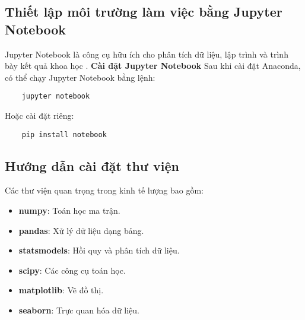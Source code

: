 \subsection{Thiết lập môi trường làm việc bằng Jupyter Notebook}
Jupyter Notebook là công cụ hữu ích cho phân tích dữ liệu, lập trình và trình bày kết quả khoa học \cite{kluyver2016jupyter}.
\textbf{Cài đặt Jupyter Notebook}
Sau khi cài đặt Anaconda, có thể chạy Jupyter Notebook bằng lệnh:
\begin{verbatim}
    jupyter notebook
\end{verbatim}
Hoặc cài đặt riêng:
\begin{verbatim}
    pip install notebook
\end{verbatim}

\subsection{Hướng dẫn cài đặt thư viện}
Các thư viện quan trọng trong kinh tế lượng bao gồm:
\begin{itemize}
    \item \textbf{numpy}: Toán học ma trận.
    \item \textbf{pandas}: Xử lý dữ liệu dạng bảng.
    \item \textbf{statsmodels}: Hồi quy và phân tích dữ liệu.
    \item \textbf{scipy}: Các công cụ toán học.
    \item \textbf{matplotlib}: Vẽ đồ thị.
    \item \textbf{seaborn}: Trực quan hóa dữ liệu.
\end{itemize}